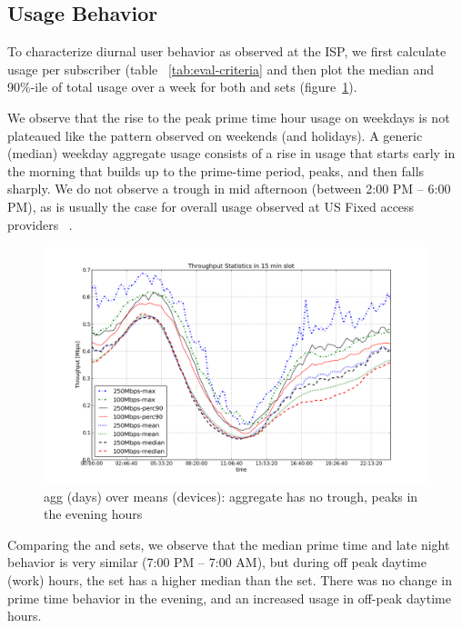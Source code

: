 \subsection{Usage Behavior}
\label{subsec:behavior}

To characterize diurnal user behavior as observed at the ISP, we first calculate
usage per subscriber (table ~\ref{tab:eval-criteria} and then plot the median and
90\%-ile of total usage over a week for both \test and \control
sets (figure~\ref{fig:TS-data-rate-daily}).

We observe that the rise to the peak prime time hour usage on weekdays
is not plateaued like the pattern observed on weekends (and holidays).
A generic (median) weekday aggregate usage consists of a rise in usage that starts
early in the morning that builds up to the prime-time period, peaks, and then falls sharply.
We do not observe a trough in mid afternoon (between 2:00 PM -- 6:00 PM), as is usually
the case for overall usage observed at US Fixed access providers ~\cite{sandvine2014report1}.

\begin{figure}[ht!]
\begin{minipage}{\linewidth}
  \centering
  \includegraphics[width=\linewidth]{figures/describe-total-throughput-per-day[replace].png}
  \caption{agg (days) over means (devices): aggregate has no trough, peaks in the evening hours}
  \label{fig:TS-data-rate-daily}
\end{minipage}
\end{figure}

Comparing the \test and \control sets, we observe that the median prime time and late night
behavior is very similar (7:00 PM -- 7:00 AM), but during off peak daytime (work) hours,
the \test set has a higher median than the \control set. There was no change in
prime time behavior in the evening, and an increased usage in off-peak daytime hours.


